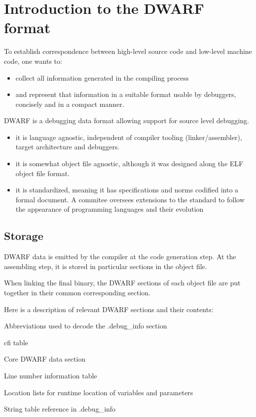 \chapter{Introduction to the DWARF format\label{cha:chapter2}}

To establish correspondence between high-level source code and low-level machine
code, one wants to:
\begin{itemize}
    \item collect all information generated in the compiling process
    \item and represent that information in a suitable format usable by
        debuggers, concisely and in a compact manner.
\end{itemize}

DWARF is a debugging data format allowing support for source level debugging.

\begin{itemize}
    \item it is language agnostic, independent of compiler tooling (linker/assembler), target architecture and debuggers.
    \item it is somewhat object file agnostic, although it was designed along the ELF object file format.
    \item it is standardized, meaning it has specifications and norms codified into
        a formal document. A commitee oversees extensions to the standard to
        follow the appearance of programming languages and their evolution
\end{itemize}

\section{Storage}

DWARF data is emitted by the compiler at the code generation step.
At the assembling step, it is stored in particular sections in the object file.

When linking the final binary, the DWARF sections of each object file are
put together in their common corresponding section.

Here is a description of relevant DWARF sections and their contents:

\begin{description}[labelwidth=\widthof{\bfseries .debug\_abbrev},align=parright]
    \item[.debug\_abbrev] Abbreviations used to decode the .debug\_info section
    \item[.debug\_frame] \gls{cfi} table
    \item[.debug\_info] Core DWARF data section
    \item[.debug\_line] Line number information table
    \item[.debug\_loc] Location lists for runtime location of variables and parameters
    \item[.debug\_str] String table reference in .debug\_info
\end{description}

